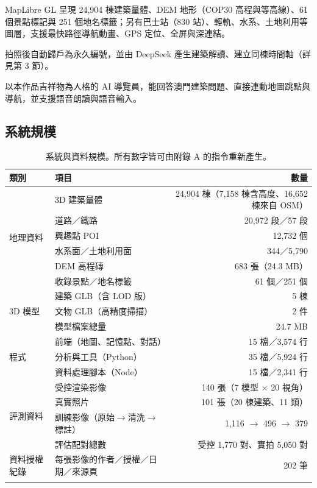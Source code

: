\documentclass[11pt,a4paper,fontset=windows]{ctexart}
\begin{document}
\begin{description}[leftmargin=1.2em,itemsep=3pt]
  \item[第一層｜3D 立體澳門地圖] MapLibre GL 呈現 24,904 棟建築量體、DEM 地形（COP30 高程與等高線）、61 個景點標記與 251 個地名標籤；另有巴士站（830 站）、輕軌、水系、土地利用等圖層，支援最快路徑導航動畫、GPS 定位、全屏與深連結。
  \item[第二層｜建築記憶點] 拍照後自動歸戶為永久編號，並由 DeepSeek 產生建築解讀、建立同棟時間軸（詳見第 3 節）。
  \item[第三層｜吉祥物「阿獅」對話介面] 以本作品吉祥物為人格的 AI 導覽員，能回答澳門建築問題、直接連動地圖跳點與導航，並支援語音朗讀與語音輸入。
\end{description}

\subsection{系統規模}
\begin{longtable}{@{}llr@{}}
\toprule
\textbf{類別} & \textbf{項目} & \textbf{數量} \\
\midrule
\multirow{6}{*}{地理資料}
 & 3D 建築量體 & 24,904 棟（7,158 棟含高度、16,652 棟來自 OSM） \\
 & 道路／鐵路 & 20,972 段／57 段 \\
 & 興趣點 POI & 12,732 個 \\
 & 水系面／土地利用面 & 344／5,790\\
 & DEM 高程磚 & 683 張（24.3 MB） \\
 & 收錄景點／地名標籤 & 61 個／251 個 \\
\midrule
\multirow{3}{*}{3D 模型}
 & 建築 GLB（含 LOD 版） & 5 棟 \\
 & 文物 GLB（高精度掃描） & 2 件 \\
 & 模型檔案總量 & 24.7 MB \\
\midrule
\multirow{3}{*}{程式}
 & 前端（地圖、記憶點、對話） & 15 檔／3,574 行 \\
 & 分析與工具（Python） & 35 檔／5,924 行 \\
 & 資料處理腳本（Node） & 15 檔／2,341 行 \\
\midrule
\multirow{4}{*}{評測資料}
 & 受控渲染影像 & 140 張（7 模型 $\times$ 20 視角） \\
 & 真實照片 & 101 張（20 棟建築、11 類） \\
 & 訓練影像（原始$\rightarrow$清洗$\rightarrow$標註） & 1,116 $\rightarrow$ 496 $\rightarrow$ 379 \\
 & 評估配對總數 & 受控 1,770 對、實拍 5,050 對 \\
\midrule
資料授權紀錄 & 每張影像的作者／授權／日期／來源頁 & 202 筆 \\
\bottomrule
\caption{系統與資料規模。所有數字皆可由附錄 A 的指令重新產生。}
\end{longtable}
\end{document}
